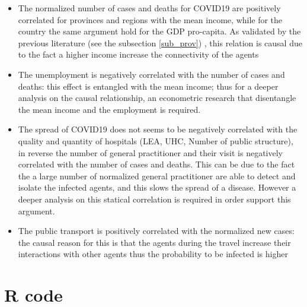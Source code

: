 \documentclass[
12pt, %
a4paper, %
oneside, %
headinclude,footinclude, %
BCOR5mm, %
]{scrartcl}
\begin{document}
\begin{itemize}
\item The normalized number of cases and deaths for COVID19 are positively correlated for provinces and regions with the mean income, while for the country the same argument hold for the GDP pro-capita. As validated by the previous literature (see the subsection \ref{sub_prov}) , this relation is causal due to the fact a higher income increase the connectivity of the agents
\item The unemployment is negatively correlated with the number of cases and deaths: this effect is entangled with the mean income; thus for a deeper analysis on the causal relationship, an econometric research that disentangle the mean income and the employment is required. 
\item The spread of COVID19 does not seems to be negatively correlated with the quality and quantity of hospitals (LEA, UHC, Number of public structure), in reverse the number of general practitioner and their visit is negatively correlated with the number of cases and deaths. This can be due to the fact the a large number of normalized general practitioner are able to detect and isolate the infected agents, and this slows the spread of a disease. However a deeper analysis on this statical correlation is required in order support this argument. 
\item The public transport is positively correlated with the normalized new cases: the causal reason for this is that the agents during the travel increase their interactions with other agents thus the probability to be infected is higher
\end{itemize}

\section{R code}





\renewcommand{\refname}{\spacedlowsmallcaps{References}} %




\end{document}
